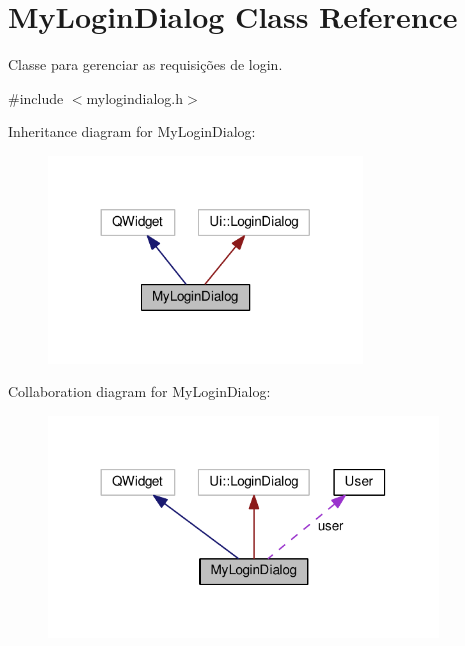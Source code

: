 \hypertarget{classMyLoginDialog}{}\section{My\+Login\+Dialog Class Reference}
\label{classMyLoginDialog}


Classe para gerenciar as requisições de login.  




{\ttfamily \#include $<$mylogindialog.\+h$>$}



Inheritance diagram for My\+Login\+Dialog\+:
\nopagebreak
\begin{figure}[H]
\begin{center}
\leavevmode
\includegraphics[width=236pt]{d5/d81/classMyLoginDialog__inherit__graph}
\end{center}
\end{figure}


Collaboration diagram for My\+Login\+Dialog\+:
\nopagebreak
\begin{figure}[H]
\begin{center}
\leavevmode
\includegraphics[width=293pt]{db/d47/classMyLoginDialog__coll__graph}
\end{center}
\end{figure}

